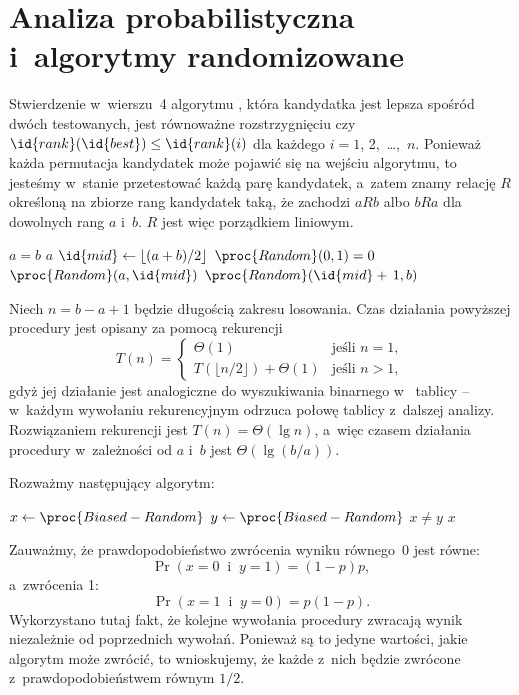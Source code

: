 \chapter{Analiza probabilistyczna i~algorytmy randomizowane}


\exercise %
Stwierdzenie w~wierszu~4 algorytmu , która kandydatka jest lepsza spośród dwóch testowanych, jest równoważne rozstrzygnięciu czy $\id{rank}(\id{best})\le\id{rank}(i)$ dla każdego $i=1$, 2,~\dots,~$n$. Ponieważ każda permutacja kandydatek może pojawić się na wejściu algorytmu, to jesteśmy w~stanie przetestować każdą parę kandydatek, a~zatem znamy relację $R$ określoną na zbiorze rang kandydatek taką, że zachodzi $aRb$ albo $bRa$ dla dowolnych rang $a$ i~$b$. $R$ jest więc porządkiem liniowym.

\exercise %
\begin{codebox}
\li	\If $a=b$
\li		\Then
			\Return $a$
		\End
\li	$\id{mid}\gets\lfloor(a+b)/2\rfloor$
\li	\If $\proc{Random}(0,1)=0$
\li		\Then
			\Return $\proc{Random}(a,\id{mid})$
\li		\Else
			\Return $\proc{Random}(\id{mid}+\,1,b)$
		\End
\end{codebox}
Niech $n=b-a+1$ będzie długością zakresu losowania. Czas działania powyższej procedury jest opisany za pomocą rekurencji
\[
    T(n) =
	\begin{cases}
		\Theta(1) & \text{jeśli $n=1$}, \\
		T(\lfloor n/2\rfloor)+\Theta(1) & \text{jeśli $n>1$},
    \end{cases}
\]
gdyż jej działanie jest analogiczne do wyszukiwania binarnego w~ tablicy -- w~każdym wywołaniu rekurencyjnym odrzuca połowę tablicy z~dalszej analizy. Rozwiązaniem rekurencji jest $T(n)=\Theta(\lg n)$, a~więc czasem działania procedury  w~zależności od $a$ i~$b$ jest $\Theta(\lg(b/a))$.

\exercise %
Rozważmy następujący algorytm:
\begin{codebox}
\li	\Repeat
		$x\gets\proc{Biased-Random}$
\li		$y\gets\proc{Biased-Random}$
\li	\Until $x\ne y$ \label{li:unbiased-repeat-end}
\li \Return $x$
\end{codebox}
Zauważmy, że prawdopodobieństwo zwrócenia wyniku równego~0 jest równe:
\[
	\Pr(x=0\;\;\text{i}\;\;y=1) = (1-p)p,
\]
a~zwrócenia 1:
\[
	\Pr(x=1\;\;\text{i}\;\;y=0) = p(1-p).
\]
Wykorzystano tutaj fakt, że kolejne wywołania procedury  zwracają wynik niezależnie od poprzednich wywołań. Ponieważ są to jedyne wartości, jakie algorytm może zwrócić, to wnioskujemy, że każde z~nich będzie zwrócone z~prawdopodobieństwem równym $1/2$.

